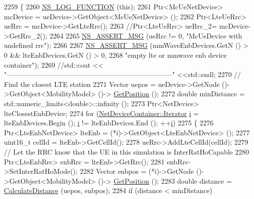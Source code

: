\begin{DoxyCode}
2259 \{
2260         \hyperlink{log-macros-disabled_8h_a90b90d5bad1f39cb1b64923ea94c0761}{NS\_LOG\_FUNCTION} (\textcolor{keyword}{this});
2261         Ptr<McUeNetDevice> mcDevice = ueDevice->GetObject<McUeNetDevice> ();
2262         Ptr<LteUeRrc> ueRrc = mcDevice->GetLteRrc();
2263         \textcolor{comment}{//Ptr<LteUeRrc> ueRrc\_2= mcDevice->GetRrc\_2();}
2264 
2265         \hyperlink{assert_8h_aff5ece9066c74e681e74999856f08539}{NS\_ASSERT\_MSG} (ueRrc != 0, \textcolor{stringliteral}{"McUeDevice with undefined rrc"});
2266 
2267         \hyperlink{assert_8h_aff5ece9066c74e681e74999856f08539}{NS\_ASSERT\_MSG} (mmWaveEnbDevices.GetN () > 0 && lteEnbDevices.GetN () > 0, 
2268                 \textcolor{stringliteral}{"empty lte or mmwave enb device container"});
2269         \textcolor{comment}{//std::cout << "------------------------------------------------------------------------"
       <<std::endl;}
2270         \textcolor{comment}{// Find the closest LTE station}
2271         Vector uepos = ueDevice->GetNode ()->GetObject<MobilityModel> ()->
      \hyperlink{lena-cqi-threshold_8cc_acebf763e1a0478cec225f9547941ae54}{GetPosition} ();
2272         \textcolor{keywordtype}{double} minDistance = std::numeric\_limits<double>::infinity ();
2273         Ptr<NetDevice> lteClosestEnbDevice;
2274         \textcolor{keywordflow}{for} (\hyperlink{classns3_1_1NetDeviceContainer_a45709bb572f975569ed985fa89b132f8}{NetDeviceContainer::Iterator} \hyperlink{bernuolliDistribution_8m_a6f6ccfcf58b31cb6412107d9d5281426}{i} = lteEnbDevices.Begin (); 
      \hyperlink{bernuolliDistribution_8m_a6f6ccfcf58b31cb6412107d9d5281426}{i} != lteEnbDevices.End (); ++\hyperlink{bernuolliDistribution_8m_a6f6ccfcf58b31cb6412107d9d5281426}{i})
2275         \{
2276                 Ptr<LteEnbNetDevice> lteEnb = (*i)->GetObject<LteEnbNetDevice> ();
2277                 uint16\_t cellId = lteEnb->GetCellId();
2278                 ueRrc->AddLteCellId(cellId);
2279                 \textcolor{comment}{// Let the RRC know that the UE in this simulation is InterRatHoCapable}
2280                 Ptr<LteEnbRrc> enbRrc = lteEnb->GetRrc();
2281                 enbRrc->SetInterRatHoMode();
2282                 Vector enbpos = (*i)->GetNode ()->GetObject<MobilityModel> ()->
      \hyperlink{lena-cqi-threshold_8cc_acebf763e1a0478cec225f9547941ae54}{GetPosition} ();
2283                 \textcolor{keywordtype}{double} distance = \hyperlink{namespacens3_aaae60adf695e280c4882ced6041d1628}{CalculateDistance} (uepos, enbpos);
2284                 \textcolor{keywordflow}{if} (distance < minDistance)

\end{DoxyCode}
